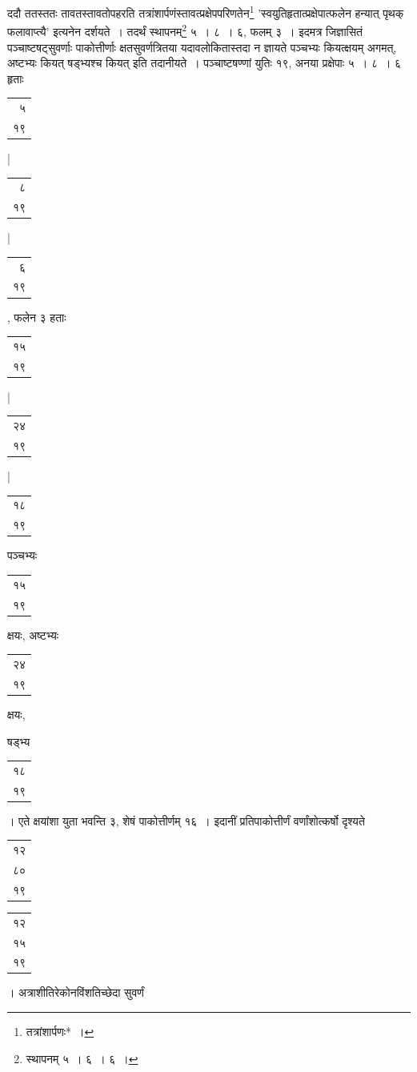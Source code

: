 \documentclass[10pt, openany]{book}
\begin{document}
{{{
{ददौ ततस्ततः तावतस्तावतोपहरति
तत्रांशार्पणंस्तावत्प्रक्षेपपरिणतेन\renewcommand{\thefootnote}{\s १०}\footnote{\s तत्रांशार्पणः*~।} {\qt 'स्वयुतिहृतात्प्रक्षेपात्फलेन हन्यात् पृथक् फलावाप्त्यै'} इत्यनेन दर्शयते~। तदर्थं
स्थापनम्\renewcommand{\thefootnote}{\s ११}\footnote{\s  स्थापनम् ५~। ६~। ६~।} ५~। ८~।}
{६, फलम् ३~। इदमत्र जिज्ञासितं पञ्चाष्टषट्सुवर्णाः पाकोत्तीर्णाः
क्षतसुवर्णत्रितया}
{यदावलोकितास्तदा न ज्ञायते पञ्चभ्यः कियत्क्षयम् अगमत्, अष्टभ्यः कियत्
षड्भ्यश्च}
{कियत् इति तदानीयते~। पञ्चाष्टषण्णां युतिः १९, अनया प्रक्षेपाः ५~। ८~। ६
हृताः}{\begin{tabular}{r}५ \\१९\end{tabular}|\begin{tabular}{r} ८ \\१९\end{tabular}|\begin{tabular}{r} ६\\१९\end{tabular}, फलेन ३ हताः\begin{tabular}{r}१५ \\१९\end{tabular}|\begin{tabular}{r}२४ \\१९\end{tabular}|\begin{tabular}{r}१८\\१९\end{tabular}पञ्चभ्यः\begin{tabular}{r}१५\\१९\end{tabular}क्षयः, अष्टभ्यः\begin{tabular}{r}२४\\१९\end{tabular}क्षयः,}
{षड्भ्य\begin{tabular}{r}१८\\१९\end{tabular}। एते क्षयांशा युता भवन्ति ३, शेषं पाकोत्तीर्णम् १६~। इदानीं
प्रतिपाकोत्तीर्णं वर्णांशोत्कर्षो दृश्यते\begin{tabular}{r|} १२ \\ ८० \\१९\end{tabular}\begin{tabular}{r}१२ \\ १५\\ १९\end{tabular}}। अत्राशीतिरेकोनविंशतिच्छेदा सुवर्णं
}}}
\end{document}
